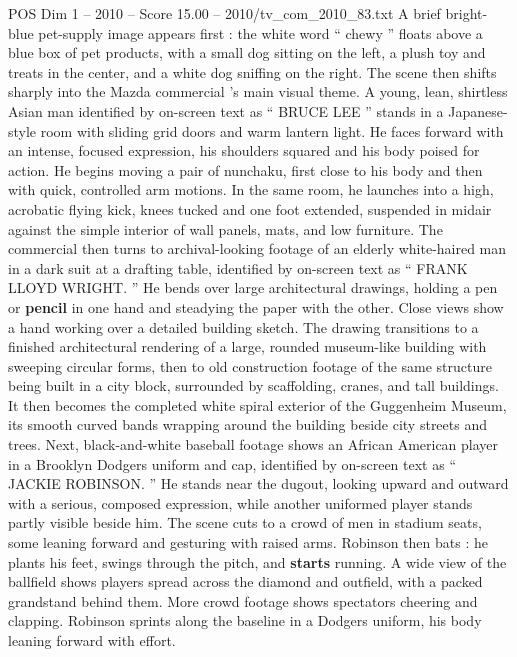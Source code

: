\begin{textsample}{POS Dim 1 – 2010 – Score 15.00 – 2010/tv\_com\_2010\_83.txt}  \label{ex:f1_pos_028}
A brief bright-blue pet-supply image appears first : the white word “ chewy ” floats above a blue box of pet products, with a small dog sitting on the left, a plush toy and treats in the center, and a white dog sniffing on the right.
The scene then shifts sharply into the Mazda commercial ’s main visual theme.
A young, lean, shirtless Asian man identified by on-screen text as “ BRUCE LEE ” stands in a Japanese-style room with sliding grid doors and warm lantern light.
He faces forward with an intense, focused expression, his shoulders squared and his body poised for action.
He begins moving a pair of nunchaku, first close to his body and then with quick, controlled arm motions.
In the same room, he launches into a high, acrobatic flying kick, knees tucked and one foot extended, suspended in midair against the simple interior of wall panels, mats, and low furniture.
The commercial then turns to archival-looking footage of an elderly white-haired man in a dark suit at a drafting table, identified by on-screen text as “ FRANK LLOYD WRIGHT. ” He bends over large architectural drawings, holding a pen or \textbf{pencil} in one hand and steadying the paper with the other.
Close views show a hand working over a detailed building sketch.
The drawing transitions to a finished architectural rendering of a large, rounded museum-like building with sweeping circular forms, then to old construction footage of the same structure being built in a city block, surrounded by scaffolding, cranes, and tall buildings.
It then becomes the completed white spiral exterior of the Guggenheim Museum, its smooth curved bands wrapping around the building beside city streets and trees.
Next, black-and-white baseball footage shows an African American player in a Brooklyn Dodgers uniform and cap, identified by on-screen text as “ JACKIE ROBINSON. ” He stands near the dugout, looking upward and outward with a serious, composed expression, while another uniformed player stands partly visible beside him.
The scene cuts to a crowd of men in stadium seats, some leaning forward and gesturing with raised arms.
Robinson then bats : he plants his feet, swings through the pitch, and \textbf{starts} running.
A wide view of the ballfield shows players spread across the diamond and outfield, with a packed grandstand behind them.
More crowd footage shows spectators cheering and clapping.
Robinson sprints along the baseline in a Dodgers uniform, his body leaning forward with effort.

\end{textsample}

